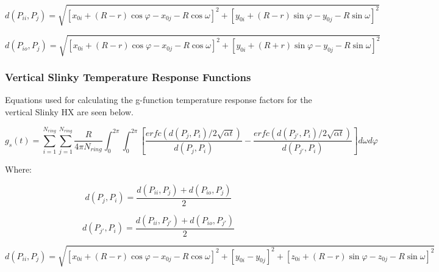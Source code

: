 \begin{equation}
d\left(P_{ii},P_j\right) = \sqrt{\left[x_{0i} + \left(R-r\right)\cos \varphi - x_{0j}-R\cos \omega\right]^2 + \left[y_{0i} + \left(R-r\right)\sin \varphi - y_{0j}-R\sin \omega\right]^2}
\end{equation}

\begin{equation}
d\left(P_{io},P_j\right) = \sqrt{\left[x_{0i} + \left(R-r\right)\cos \varphi - x_{0j}-R\cos \omega\right]^2 + \left[y_{0i} + \left(R+r\right)\sin \varphi - y_{0j}-R\sin \omega\right]^2}
\end{equation}

\subsubsection{Vertical Slinky Temperature Response Functions}\label{vertical-slinky-temperature-response-functions}

Equations used for calculating the g-function temperature response factors for the vertical Slinky HX are seen below.

\begin{equation}
g_s\left(t\right) = \sum_{i = 1}^{N_{ring}} \sum_{j = 1}^{N_{ring}} \frac{R}{4\pi N_{ring}} \int_0^{2\pi} \int_0^{2\pi} 
            \left[ 
                \frac{erfc\left(d\left(P_j,P_i\right)/2\sqrt{\alpha t}\right)}{d\left(P_j,P_i\right)} - 
                \frac{erfc\left(d\left(P_{j'},P_i\right)/2\sqrt{\alpha t}\right)}{d\left(P_{j'},P_i\right)}
            \right]d\omega d\varphi
\end{equation}

Where:

\begin{equation}
d\left(P_j,P_i\right) = \frac{d\left(P_{ii},P_j\right) + d\left(P_{io},P_j\right)}{2}
\end{equation}

\begin{equation}
d\left(P_{j'},P_i\right) = \frac{d\left(P_{ii},P_{j'}\right) + d\left(P_{io},P_{j'}\right)}{2}
\end{equation}

{\scriptsize
\begin{equation}
d\left(P_{ii},P_j\right) = \sqrt{\left[x_{0i} + \left(R-r\right)\cos \varphi - x_{0j}-R\cos \omega\right]^2 + \left[y_{0i}-y_{0j}\right]^2 + \left[z_{0i} + \left(R-r\right)\sin \varphi - z_{0j}-R\sin \omega\right]^2}
\end{equation}}

